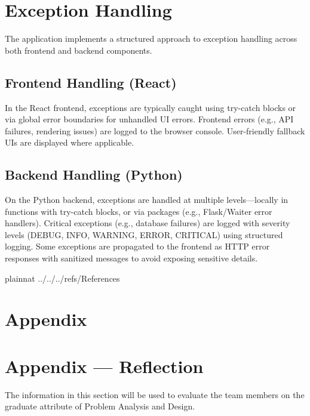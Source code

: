 \documentclass[12pt, titlepage]{article}
\begin{document}
\section{Exception Handling} \label{sec:ExceptionHandling}

The application implements a structured approach to exception handling across both frontend and backend components.

\subsection{Frontend Handling (React)}

In the React frontend, exceptions are typically caught using try-catch blocks or via global error boundaries for unhandled UI errors. Frontend errors (e.g., API failures, rendering issues) are logged to the browser console. User-friendly fallback UIs are displayed where applicable.

\subsection{Backend Handling (Python)}

On the Python backend, exceptions are handled at multiple levels—locally in functions with try-catch blocks, or via packages (e.g., Flask/Waiter error handlers). Critical exceptions (e.g., database failures) are logged with severity levels (DEBUG, INFO, WARNING, ERROR, CRITICAL) using structured logging. Some exceptions are propagated to the frontend as HTTP error responses with sanitized messages to avoid exposing sensitive details.


 {plainnat}
 {../../../refs/References}

\newpage

\section{Appendix} \label{Appendix}


\newpage{}

\section*{Appendix --- Reflection}


The information in this section will be used to evaluate the team members on the
graduate attribute of Problem Analysis and Design.
\end{document}
